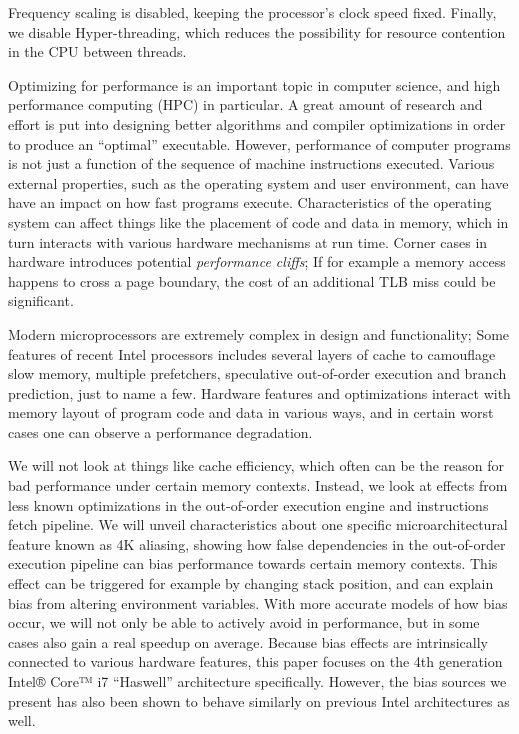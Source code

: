 \documentclass[a4paper,10pt,twocolumn,twoside]{article}
\begin{document}
Frequency scaling is disabled, keeping the processor's clock speed fixed.
Finally, we disable Hyper-threading, which reduces the possibility for resource contention in the CPU between threads.





\iffalse
Optimizing for performance is an important topic in computer science, and high performance computing (HPC) in particular. 
A great amount of research and effort is put into designing better algorithms and compiler optimizations in order to produce an ``optimal'' executable. 
However, performance of computer programs is not just a function of the sequence of machine instructions executed. 
Various external properties, such as the operating system and user environment, can have have an impact on how fast programs execute. 
Characteristics of the operating system can affect things like the placement of code and data in memory, which in turn interacts with various hardware mechanisms at run time.
Corner cases in hardware introduces potential \emph{performance cliffs}; If for example a memory access happens to cross a page boundary, the cost of an additional TLB miss could be significant. 

Modern microprocessors are extremely complex in design and functionality; Some features of recent Intel processors includes several layers of cache to camouflage slow memory, multiple prefetchers, speculative out-of-order execution and branch prediction, just to name a few.
Hardware features and optimizations interact with memory layout of program code and data in various ways, and in certain worst cases one can observe a performance degradation.

We will not look at things like cache efficiency, which often can be the reason for bad performance under certain memory contexts. 
Instead, we look at effects from less known optimizations in the out-of-order execution engine and instructions fetch pipeline. 
We will unveil characteristics about one specific microarchitectural feature known as 4K aliasing, showing how false dependencies in the out-of-order execution pipeline can bias performance towards certain memory contexts. 
This effect can be triggered for example by changing stack position, and can explain bias from altering environment variables.
With more accurate models of how bias occur, we will not only be able to actively avoid in performance, but in some cases also gain a real speedup on average.
Because bias effects are intrinsically connected to various hardware features, this paper focuses on the 4th generation Intel® Core™ i7 ``Haswell'' architecture specifically. 
However, the bias sources we present has also been shown to behave similarly on previous Intel architectures as well.
\end{document}
